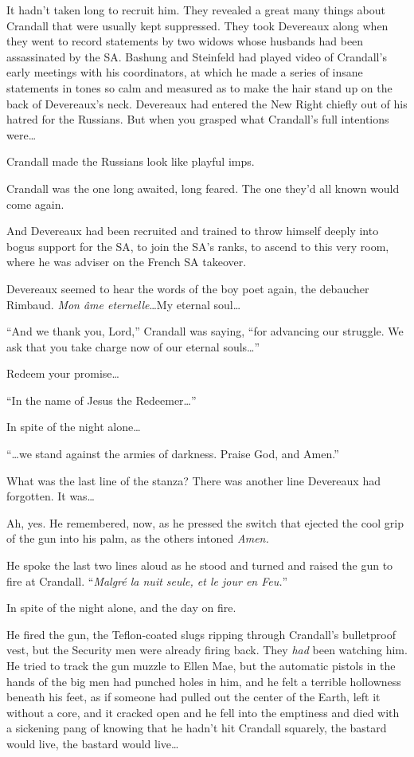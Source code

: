 It hadn't taken long to recruit him. They revealed a great many things about Crandall that were usually kept suppressed. They took Devereaux along when they went to record statements by two widows whose husbands had been assassinated by the SA. Bashung and Steinfeld had played video of Crandall's early meetings with his coordinators, at which he made a series of insane statements in tones so calm and measured as to make the hair stand up on the back of Devereaux's neck. Devereaux had entered the New Right chiefly out of his hatred for the Russians. But when you grasped what Crandall's full intentions were\ldots

Crandall made the Russians look like playful imps.

Crandall was the one long awaited, long feared. The one they'd all known would come again.

And Devereaux had been recruited and trained to throw himself deeply into bogus support for the SA, to join the SA's ranks, to ascend to this very room, where he was adviser on the French SA takeover.

Devereaux seemed to hear the words of the boy poet again, the debaucher Rimbaud. \textit{Mon âme eternelle}\ldots My eternal soul\ldots

``And we thank you, Lord,'' Crandall was saying, ``for advancing our struggle. We ask that you take charge now of our eternal souls\ldots ''

Redeem your promise\ldots

``In the name of Jesus the Redeemer\ldots ''

In spite of the night alone\ldots

``\ldots we stand against the armies of darkness. Praise God, and Amen.''

What was the last line of the stanza? There was another line Devereaux had forgotten. It was\ldots

Ah, yes. He remembered, now, as he pressed the switch that ejected the cool grip of the gun into his palm, as the others intoned \textit{Amen.}

He spoke the last two lines aloud as he stood and turned and raised the gun to fire at Crandall. ``\textit{Malgré la nuit seule, et le jour en Feu.}''

In spite of the night alone, and the day on fire.

He fired the gun, the Teflon-coated slugs ripping through Crandall's bulletproof vest, but the Security men were already firing back. They \textit{had} been watching him. He tried to track the gun muzzle to Ellen Mae, but the automatic pistols in the hands of the big men had punched holes in him, and he felt a terrible hollowness beneath his feet, as if someone had pulled out the center of the Earth, left it without a core, and it cracked open and he fell into the emptiness and died with a sickening pang of knowing that he hadn't hit Crandall squarely, the bastard would live, the bastard would live\ldots


